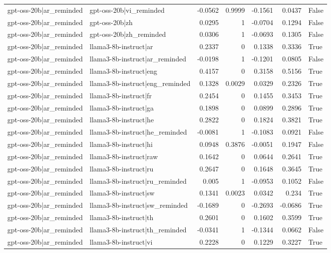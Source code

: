 \begin{table}
\begin{tabular}{l l r r r r l}
gpt-oss-20b|ar_reminded & gpt-oss-20b|vi_reminded & -0.0562 & 0.9999 & -0.1561 & 0.0437 & False \\
gpt-oss-20b|ar_reminded & gpt-oss-20b|zh & 0.0295 & 1 & -0.0704 & 0.1294 & False \\
gpt-oss-20b|ar_reminded & gpt-oss-20b|zh_reminded & 0.0306 & 1 & -0.0693 & 0.1305 & False \\
gpt-oss-20b|ar_reminded & llama3-8b-instruct|ar & 0.2337 & 0 & 0.1338 & 0.3336 & True \\
gpt-oss-20b|ar_reminded & llama3-8b-instruct|ar_reminded & -0.0198 & 1 & -0.1201 & 0.0805 & False \\
gpt-oss-20b|ar_reminded & llama3-8b-instruct|eng & 0.4157 & 0 & 0.3158 & 0.5156 & True \\
gpt-oss-20b|ar_reminded & llama3-8b-instruct|eng_reminded & 0.1328 & 0.0029 & 0.0329 & 0.2326 & True \\
gpt-oss-20b|ar_reminded & llama3-8b-instruct|fr & 0.2454 & 0 & 0.1455 & 0.3453 & True \\
gpt-oss-20b|ar_reminded & llama3-8b-instruct|ga & 0.1898 & 0 & 0.0899 & 0.2896 & True \\
gpt-oss-20b|ar_reminded & llama3-8b-instruct|he & 0.2822 & 0 & 0.1824 & 0.3821 & True \\
gpt-oss-20b|ar_reminded & llama3-8b-instruct|he_reminded & -0.0081 & 1 & -0.1083 & 0.0921 & False \\
gpt-oss-20b|ar_reminded & llama3-8b-instruct|hi & 0.0948 & 0.3876 & -0.0051 & 0.1947 & False \\
gpt-oss-20b|ar_reminded & llama3-8b-instruct|raw & 0.1642 & 0 & 0.0644 & 0.2641 & True \\
gpt-oss-20b|ar_reminded & llama3-8b-instruct|ru & 0.2647 & 0 & 0.1648 & 0.3645 & True \\
gpt-oss-20b|ar_reminded & llama3-8b-instruct|ru_reminded & 0.005 & 1 & -0.0953 & 0.1052 & False \\
gpt-oss-20b|ar_reminded & llama3-8b-instruct|sw & 0.1341 & 0.0023 & 0.0342 & 0.234 & True \\
gpt-oss-20b|ar_reminded & llama3-8b-instruct|sw_reminded & -0.1689 & 0 & -0.2693 & -0.0686 & True \\
gpt-oss-20b|ar_reminded & llama3-8b-instruct|th & 0.2601 & 0 & 0.1602 & 0.3599 & True \\
gpt-oss-20b|ar_reminded & llama3-8b-instruct|th_reminded & -0.0341 & 1 & -0.1344 & 0.0662 & False \\
gpt-oss-20b|ar_reminded & llama3-8b-instruct|vi & 0.2228 & 0 & 0.1229 & 0.3227 & True \\

\end{tabular}
\end{table}

